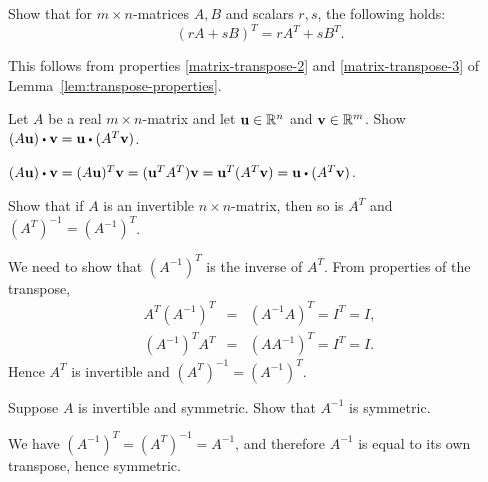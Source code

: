 \begin{ex}
  Show that for $m \times n$-matrices $A,B$ and scalars $r, s$, the
  following holds:
  \begin{equation*}
    (rA + sB) ^T = rA^{T} + sB^{T}.
  \end{equation*}
  \vspace{-4ex}
  \begin{sol}
    This follows from properties {\ref{matrix-transpose-2}} and
    {\ref{matrix-transpose-3}} of
    Lemma~\ref{lem:transpose-properties}.
  \end{sol}
\end{ex}

\begin{ex} \label{exer-Rn3}  Let $A$ be a real $m\times n$-matrix and
  let $\mbox{\bf u}\in \mathbb{R}^{n}$ and $\mbox{\bf v}\in \mathbb{R}^{m}$. Show 
  $(A\vect{u})\dotprod \vect{v}=\vect{u}\dotprod (A^{T}\vect{v})$. 
  \begin{sol}
    $(A\vect{u})\dotprod \vect{v} = (A\vect{u})^T\vect{v} =
    (\vect{u}^TA^T)\vect{v}  = \vect{u}^T(A^T\vect{v}) =
    \vect{u}\dotprod (A^T\vect{v})$.
  \end{sol}
\end{ex}

\begin{ex}
  Show that if $A$ is an invertible $n\times n$-matrix, then so is
  $A^{T} $ and $(A^{T})^{-1}=(A^{-1})^{T}$.
  \begin{sol}
    We need to show that $(A^{-1})^{T}$ is the inverse of
    $A^{T}$. From properties of the transpose,
    \begin{eqnarray*}
      A^{T}(A^{-1})^{T} &=& (A^{-1}A)^{T}=I^{T}=I, \\
      (A^{-1})^{T}A^{T} &=& (AA^{-1})^{T}=I^{T}=I.
    \end{eqnarray*}
    Hence $A^{T}$ is invertible and $(A^{T})^{-1}=(A^{-1})^{T}$.
  \end{sol}
\end{ex}

\begin{ex}
  Suppose $A$ is invertible and symmetric. Show that $A^{-1}$ is
  symmetric.
  \begin{sol}
    We have $(A^{-1})^T = (A^T)^{-1} = A^{-1}$, and therefore $A^{-1}$
    is equal to its own transpose, hence symmetric.
  \end{sol}
\end{ex}

